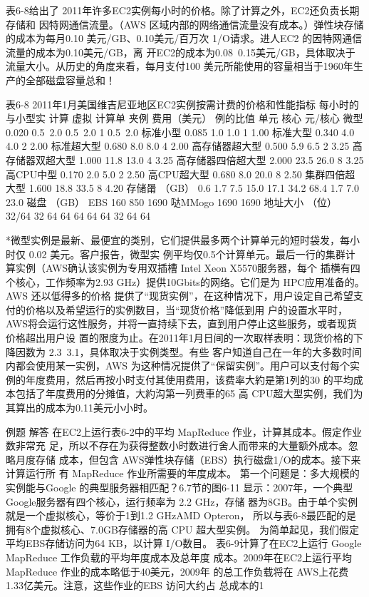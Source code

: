 表6-8给出了 2011年许多EC2实例每小时的价格。除了计算之外，EC2还负责长期存储和
因特网通信流量。（AWS 区域内部的网络通信流量没有成本。）弹性块存储的成本为每月0.10
美元/GB、0.10美元/百万次 1/O请求。进人EC2 的因特网通信流量的成本为0.10美元/GB，离
开EC2的成本为0.08~0.15美元/GB，具体取决于流量大小。从历史的角度来看，每月支付100
美元所能使用的容量相当于1960年生产的全部磁盘容量总和！

表6-8 2011年1月美国维吉尼亚地区EC2实例按需计费的价格和性能指标
每小时的
与小型实
计算
虚拟
计算单
夹例
费用（美元）
例的比值
单元
核心
元/核心
微型
0.020
0.5~2.0
0.5~2.0
1
0.5~2.0
标准小型
0.085
1.0
1.0
1
1.00
标准大型
0.340
4.0
4.0
2
2.00
标准超大型
0.680
8.0
8.0
4
2.00
高存储器超大型
0.500
5.9
6.5
2
3.25
高存储器双超大型
1.000
11.8
13.0
4
3.25
高存储器四倍超大型
2.000
23.5
26.0
8
3.25
高CPU中型
0.170
2.0
5.0
2
2.50
高CPU超大型
0.680
8.0
20.0
8
2.50
集群四倍超大型
1.600
18.8
33.5
8
4.20
存储𤰉
（GB）
0.6
1.7
7.5
15.0
17.1
34.2
68.4
1.7
7.0
23.0
磁盘
（GB）
EBS
160
850
1690
哒MMogo
1690
1690
地址大小
（位）
32/64
32
64
64
64
64
64
32
64
64

*微型实例是最新、最便宜的类别，它们提供最多两个计算单元的短时袋发，每小时仅 0.02 美元。客户报告，微型实
例平均仅0.5个计算单元。最后一行的集群计算实例（AWS确认该实例为专用双插槽 Intel Xeon X5570服务器，每个
插横有四个核心，工作频率为2.93 GHz）提供10Gbits的网络。它们是为 HPC应用准备的。AWS 还以低得多的价格
提供了“现货实例”，在这种情况下，用户设定自己希望支付的价格以及希望运行的实例数目，当“现货价格”降低到用
户的设置水平时，AWS将会运行这性服务，并将一直持续下去，直到用户停止这些服务，或者现货价格超出用户设
置的限度为止。在2011年1月日间的一次取样表明：现货价格的下降因数为 2.3~3.1，具体取决于实例类型。有些
客户知道自己在一年的大多数时间内都会使用某一实例，AWS 为这种情况提供了“保留实例”。用户可以支付每个实
例的年度费用，然后再按小时支付其使用费用，该费率大約是第1列的30%
的平均成本包括了年度费用的分摊值，大約沟第一列费車的65%
高 CPU超大型实例，我们为其算出的成本为0.11美元小小时。

例题
解答
在EC2上运行表6-2中的平均 MapReduce 作业，计算其成本。假定作业数非常充
足，所以不存在为获得整数小时数进行舍人而带来的大量额外成本。忽略月度存储
成本，但包含 AWS弹性块存储（EBS）执行磁盘1/O的成本。接下来计算运行所
有 MapReduce 作业所需要的年度成本。
第一个问题是：多大规模的实例能与Google 的典型服务器相匹配？6.7节的图6-11
显示：2007年，一个典型 Google服务器有四个核心，运行频率为 2.2 GHz，存储
器为8GB。由于单个实例就是一个虚拟核心，等价于1到1.2 GHzAMD Opteron，
所以与表6-8最匹配的是拥有8个虚拟核心、7.0GB存储器的高 CPU 超大型实例。
为简单起见，我们假定平均EBS存储访问为64 KB，以计算 I/O数目。
表6-9计算了在EC2上运行 Google MapReduce 工作负载的平均年度成本及总年度
成本。2009年在EC2上运行平均 MapReduce 作业的成本略低于40美元，2009年
的总工作负载将在 AWS上花费1.33亿美元。注意，这些作业的EBS 访问大约占
总成本的1%

